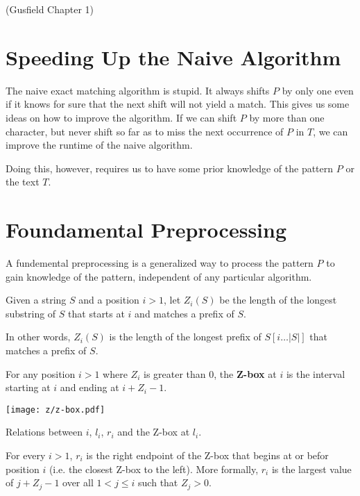 (Gusfield Chapter 1)

\section{Speeding Up the Naive Algorithm}

The naive exact matching algorithm is stupid. It always shifts $P$ by only one even if it knows for sure that the next shift will not yield a match. This gives us some ideas on how to improve the algorithm. If we can shift $P$ by more than one character, but never shift so far as to miss the next occurrence of $P$ in $T$, we can improve the runtime of the naive algorithm.

Doing this, however, requires us to have some prior knowledge of the pattern $P$ or the text $T$.

\section{Foundamental Preprocessing}

A fundemental preprocessing is a generalized way to process the pattern $P$ to gain knowledge of the pattern, independent of any particular algorithm.

\begin{definition}
    Given a string $S$ and a position $i>1$, let $Z_i(S)$ be the length of the longest substring of $S$ that starts at $i$ and matches a prefix of $S$.

    In other words, $Z_i(S)$ is the length of the longest prefix of $S[i\ldots |S|]$ that matches a prefix of $S$.
\end{definition}

\begin{definition}[Z-box] 
    For any position $i > 1$ where $Z_i$ is greater than 0, the \textbf{Z-box} at $i$ is the interval starting at $i$ and ending at $i+Z_i-1$.
\end{definition}

\begin{marginfigure}
    \texttt{[image: z/z-box.pdf]}
    \caption{Relations between $i$, $l_i$, $r_i$ and the Z-box at $l_i$.}
    \label{fig:z-box}
\end{marginfigure}

\begin{definition}
    For every $i > 1$, $r_i$ is the right endpoint of the Z-box that begins at or befor position $i$ (i.e. the closest Z-box to the left). More formally, $r_i$ is the largest value of $j + Z_j - 1$ over all $1 < j \leq i$ such that $Z_j > 0$.
\end{definition}


